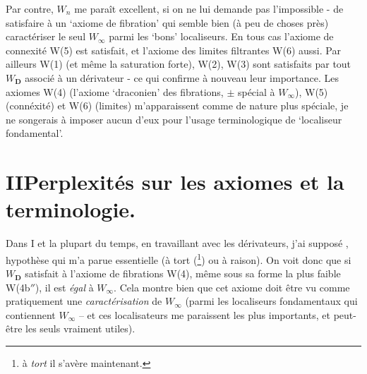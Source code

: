 \documentclass[11pt]{article}
\newcommand{\printedpage}[1]{\marginpar{\footnotesize p.~#1}}
\newcommand{\msp}[1]{\marginpar{\footnotesize [#1]}}
\begin{document}
Par contre, $W_n$ me paraît excellent, si on ne lui demande pas l'impossible - de satisfaire à un `axiome de fibration' qui semble bien (à peu de choses près) caractériser le seul $W_\infty$ parmi les `bons' localiseurs. En tous cas l'axiome de connexité W(5) est satisfait, et l'axiome des limites filtrantes W(6) aussi. Par ailleurs W(1) (et même la saturation forte), W(2), W(3) sont satisfaits par tout $W_{\mathbf{D}}$ associé à un dérivateur - ce qui confirme à nouveau leur importance. Les axiomes W(4) (l'axiome `draconien' des fibrations, $\pm$ spécial à $W_\infty$), W(5) (connéxité) et %
\printedpage{15}
\msp{page 18}W(6) (limites) m'apparaissent comme de nature plus spéciale, je ne songerais à imposer aucun d'eux pour l'usage terminologique de `localiseur fondamental'.

\newpage
\printedpage{16}
\section*{II\quad Perplexités sur les axiomes et la terminologie.}

Dans I et la plupart du temps, en travaillant avec les dérivateurs, j'ai supposé , hypothèse qui m'a parue essentielle (à tort (\footnote[38]{à \textit{tort} il s'avère maintenant.}) ou à raison). On voit donc que si $W_{\mathbf{D}}$ satisfait à l'axiome de fibrations W(4), même sous sa forme la plus faible W(4b$''$), il est \textit{égal} à $W_\infty$. Cela montre bien que cet axiome doit être vu comme pratiquement une \textit{caractérisation} de $W_\infty$ (parmi les localiseurs fondamentaux qui contiennent $W_\infty$ -- et ces localisateurs me paraissent les plus importants, et peut-être les seuls vraiment utiles).
\end{document}
